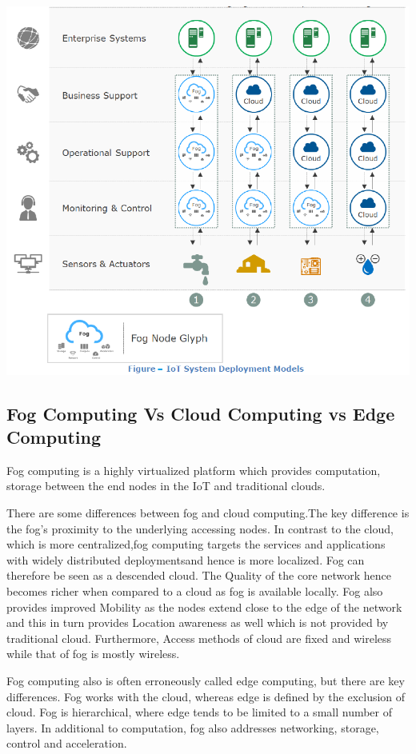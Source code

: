 \documentclass{article}
\begin{document}
\includegraphics[scale=0.7]{models.png}  


\subsection{Fog Computing Vs Cloud Computing vs Edge Computing}

Fog computing is a highly virtualized platform which provides computation, storage between the end nodes in the IoT and traditional clouds\cite{aazam2015dynamic}.

There are some differences between fog and cloud computing.The key difference is the fog’s proximity to the underlying accessing nodes.
In contrast to the cloud, which is more centralized,fog computing targets the services and applications with widely distributed deployments\cite{aazam2015dynamic}and hence is more localized. Fog can therefore be seen as a descended cloud.
The Quality of the core network hence becomes richer when compared to a cloud as fog is available locally. Fog also provides improved Mobility as the nodes extend close to the edge of the network and this in turn provides Location awareness as well which is not provided by traditional cloud. 
Furthermore, Access methods of cloud are fixed and wireless while that of fog is mostly wireless.  

Fog computing also is often erroneously called edge computing, but there are key differences. Fog works with the cloud, whereas edge is defined by the exclusion of cloud\cite{openfogconsortium2017}. 
Fog is hierarchical, where edge tends to be limited to a small number of layers. In additional to computation, fog also addresses networking, storage, control and acceleration\cite{openfogconsortium2017}.
\end{document}

